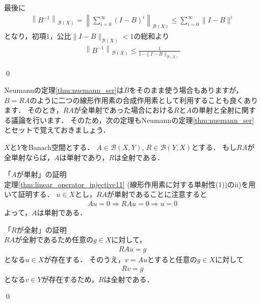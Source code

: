 \begin{Proof}
最後に
\begin{align*}
\left\| B^{-1} \right\|_{{\mathcal B}(X)} = \left\|  \sum_{i = 0}^\infty (I - B)^i \right\|_{{\mathcal B}(X)} \le \sum_{i=0}^\infty \| I - B \|^i
\end{align*}
となり，初項$1$，公比$\| I - B \|_{{\mathcal B}(X)} < 1$の総和より
\begin{align*}
\left\| B^{-1} \right\|_{{\mathcal B}(X)} \le \frac{1}{ 1 - \| I - B \|_{{\mathcal B}(X)} }
\end{align*}

\qed
\end{Proof}

Neumannの定理\ref{thm:nuemann_ser}は$B$をそのまま使う場合もありますが，$B = RA$のように二つの線形作用素の合成作用素として利用することも良くあります．
そのとき，$RA$が全単射であった場合における$R$と$A$の単射と全射に関する議論を行います．
そのため，次の定理もNeumannの定理\ref{thm:nuemann_ser}とセットで覚えておきましょう．

\begin{Thm}\label{thm:injective_surjective}
$X$と$Y$をBanach空間とする．
$A \in {\mathcal B}(X, Y)$, $R \in {\mathcal B}(Y, X)$とする．
もし$RA$が全単射ならば，$A$は単射であり，$R$は全射である．
\end{Thm}

\begin{Proof}
「$A$が単射」の証明\\
定理\ref{thm:linear_operator_injective11} (線形作用素に対する単射性(1))のii)を用いて証明する．
$u \in X$とし，$RA$が単射であることに注意すると
\begin{align*}
A u = 0 \Rightarrow RAu = 0 \Rightarrow u = 0
\end{align*}
よって，$A$は単射である．

「$R$が全射」の証明\\
$RA$が全射であるため任意の$g \in X$に対して，
\begin{align*}
RA u = g
\end{align*}
となる$u \in X$が存在する．
そのうえ，$v = Au$とすると任意の$g \in X$に対して
\begin{align*}
R v = g
\end{align*}
となる$v \in Y$が存在するため，$R$は全射である．

\qed
\end{Proof}


